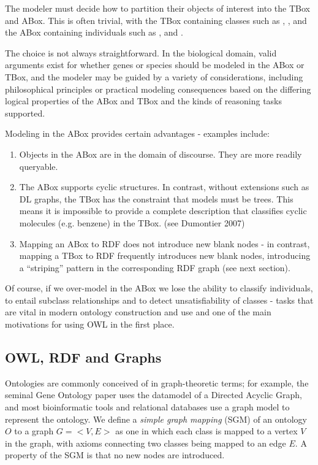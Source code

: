 \documentclass{my}
\begin{document}
The modeler must decide how to partition their objects of interest
into the TBox and ABox. This is often trivial, with the TBox
containing classes such as , ,  and the
ABox containing individuals such as ,  and .

The choice is not always straightforward. In the biological domain,
valid arguments exist for whether genes or species should be modeled
in the ABox or TBox, and the modeler may be guided by a variety of
considerations, including philosophical principles or practical
modeling consequences based on the differing logical properties of the
ABox and TBox and the kinds of reasoning tasks supported.

Modeling in the ABox provides certain advantages - examples include:

\begin{enumerate}

\item Objects in the ABox are in the domain of discourse. They are
  more readily queryable.

\item The ABox supports cyclic structures. In contrast, without
  extensions such as DL graphs, the TBox has the constraint that
  models must be trees. This means it is impossible to provide a
  complete description that classifies cyclic molecules (e.g. benzene)
  in the TBox. (see Dumontier 2007\cite{Dumontier2007})

\item Mapping an ABox to RDF does not introduce new blank nodes - in
  contrast, mapping a TBox to RDF frequently introduces new blank
  nodes, introducing a ``striping'' pattern in the corresponding RDF
  graph (see next section).

\end{enumerate}

Of course, if we over-model in the ABox we lose the ability to
classify individuals, to entail subclass relationships and to detect
unsatisfiability of classes - tasks that are vital in modern ontology
construction and use and one of the main motivations for using OWL in
the first place.

\subsection{OWL, RDF and Graphs}

Ontologies are commonly conceived of in graph-theoretic terms; for
example, the seminal Gene Ontology paper\cite{Ashburner2000} uses the
datamodel of a Directed Acyclic Graph, and most bioinformatic tools
and relational databases use a graph model to represent the
ontology\cite{Mungall2007}. We define a \emph{simple graph mapping} (SGM) of
an ontology $O$ to a graph $G = <V,E>$ as one in which each class is
mapped to a vertex $V$ in the graph, with axioms connecting two
classes being mapped to an edge $E$. A property of the SGM is that no
new nodes are introduced.
\end{document}
